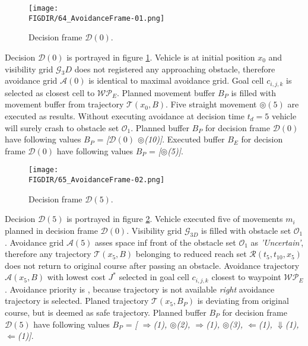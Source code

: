 \begin{figure}[H]
    \centering
    \texttt{[image: \\FIGDIR/64\_AvoidanceFrame-01.png]}
    \caption{Decision frame $\mathscr{D}(0)$.}
    \label{fig:decisionFrameSimple0}
\end{figure}
\noindent Decision $\mathscr{D}(0)$ is portrayed in figure \ref{fig:decisionFrameSimple0}. Vehicle is at initial position $x_0$ and visibility grid $\mathscr{G}_3D$ does not registered any approaching obstacle, therefore avoidance grid $\mathscr{A}(0)$ is identical to maximal avoidance grid. Goal cell $c_{i,j,k}$ is selected as closest cell to $\mathscr{WP}_E$. Planned movement buffer $B_P$ is filled with movement buffer from trajectory $\mathscr{T}(x_0,B)$. Five straight movement $\circledcirc(5)$ are executed as results. Without executing avoidance at decision time $t_d=5$ vehicle will surely crash to obstacle set $\mathscr{O}_1$.
Planned buffer $B_P$ for decision frame $\mathscr{D}(0)$ have following values $B_P$ = \textit{[$\mathscr{D}(0)$ $\circledcirc$(10)]}.
Executed buffer $B_E$ for decision frame $\mathscr{D}(0)$ have following values $B_P$ = \textit{[$\circledcirc$(5)]}.
\begin{figure}[H]
    \centering
    \texttt{[image: \\FIGDIR/65\_AvoidanceFrame-02.png]}
    \caption{Decision frame $\mathscr{D}(5)$.}
    \label{fig:decisionFrameSimple5}
\end{figure}
\newpage
\noindent Decision $\mathscr{D}(5)$ is portrayed in figure \ref{fig:decisionFrameSimple5}. Vehicle executed five of movements $m_i$ planned in decision frame $\mathscr{D}(0)$. Visibility grid $\mathscr{G}_{3D}$ is filled with obstacle set $\mathscr{O_1}$. Avoidance grid $\mathscr{A}(5)$ asses space inf front of the obstacle set $\mathscr{O}_1$ as \textit{'Uncertain'}, therefore any trajectory $\mathscr{T}(x_5,B)$ belonging to reduced reach set $\mathscr{R}(t_5,t_{10},x_{5})$ does not return to original course after passing an obstacle. Avoidance trajectory $\mathscr{A}(x_5,B)$ with lowest cost $J^*$ selected in goal cell $c_{i,j,k}$ closest to waypoint $\mathscr{WP}_E$. Avoidance priority is , because  trajectory is not available \textit{right} avoidance trajectory is selected. Planed trajectory $\mathscr{T}(x_5,B_P)$ is deviating from original course, but is deemed as safe trajectory.
Planned buffer $B_P$ for decision frame $\mathscr{D}(5)$ have following values $B_P$ = \textit{[ $\Rightarrow$(1), $\circledcirc$(2), $\Rightarrow$(1), $\circledcirc$(3), $\Leftarrow$(1), $\Downarrow$(1), $\Leftarrow$(1)]}.
